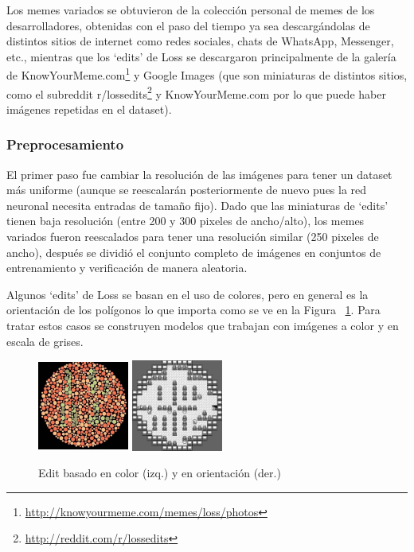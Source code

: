 \documentclass[spanish,11pt,letterpaper]{article}
\begin{document}
Los memes variados se obtuvieron de la colección personal de memes de los
desarrolladores, obtenidas con el paso del tiempo ya sea descargándolas de
distintos sitios de internet como redes sociales, chats de WhatsApp, Messenger,
etc., mientras que los `edits' de Loss se descargaron principalmente de la galería
de \textsf{KnowYourMeme.com}\footnote{\url{http://knowyourmeme.com/memes/loss/photos}} y
\textsf{Google Images} (que son miniaturas de distintos sitios, como el subreddit
\textsf{r/lossedits}\footnote{\url{http://reddit.com/r/lossedits}} y
\textsf{KnowYourMeme.com} por lo que puede haber imágenes repetidas en el dataset).

\subsubsection{Preprocesamiento}

El primer paso fue cambiar la resolución de las imágenes para tener un dataset
más uniforme (aunque se reescalarán posteriormente de nuevo pues la red neuronal
necesita entradas de tamaño fijo). Dado que las miniaturas de `edits' tienen baja
resolución (entre 200 y 300 pixeles de ancho/alto), los memes variados fueron
reescalados para tener una resolución similar (250 pixeles de ancho), después se
dividió el conjunto completo de imágenes en conjuntos de entrenamiento y
verificación de manera aleatoria.

Algunos `edits' de Loss se basan en el uso de colores, pero en general es la
orientación de los polígonos lo que importa como se ve en la Figura ~\ref{fig:color}.
Para tratar estos casos se construyen modelos que trabajan con imágenes a color
y en escala de grises.

\begin{figure}[h]
\centering
\includegraphics[height=3cm,width=3cm]{loss_color}
\includegraphics[height=3cm,width=3cm]{pokemon}
\caption{Edit basado en color (izq.) y en orientación (der.)}
\label{fig:color}
\end{figure}
\end{document}
